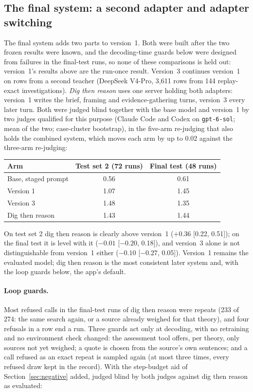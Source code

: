\subsection{The final system: a second adapter and adapter switching}\label{sec:final-system-results}
The final system adds two parts to version~1. Both were built after the two frozen results were known, and the
decoding-time guards below were designed from failures in the final-test runs, so none of these comparisons is held
out: version~1's results above are the run-once result. Version~3 continues version~1 on rows
from a second teacher (DeepSeek V4-Pro, 3,611 rows from 144 replay-exact investigations). \emph{Dig then reason} uses
one server holding both adapters: version~1 writes the brief, framing and evidence-gathering turns, version~3 every
later turn. Both were judged blind together with the base model and version~1 by two judges qualified for this purpose
(Claude Code and Codex on \texttt{gpt-6-sol}; mean of the two; case-cluster bootstrap), in the five-arm re-judging that
also holds the combined system, which moves each arm by up to 0.02 against the three-arm re-judging:

\begin{center}
\begin{tabular}{lcc}
\toprule
Arm & Test set 2 (72 runs) & Final test (48 runs)\\
\midrule
Base, staged prompt & 0.56 & 0.61\\
Version 1 & 1.07 & 1.45\\
Version 3 & 1.48 & 1.35\\
Dig then reason & 1.43 & 1.44\\
\bottomrule
\end{tabular}
\end{center}

On test set 2 dig then reason is clearly above version~1 ($+0.36$ [0.22, 0.51]); on the final test it is level with it
($-0.01$ [$-0.20$, 0.18]), and version~3 alone is not distinguishable from version~1 either ($-0.10$ [$-0.27$, 0.05]).
Version~1 remains the evaluated model; dig then reason is the most consistent later system and, with the loop guards
below, the app's default.

\paragraph{Loop guards.} Most refused calls in the final-test runs of dig then reason were repeats (233 of 274: the
same search again, or a source already weighed for that theory), and four refusals in a row end a run. Three guards act
only at decoding, with no retraining and no environment check changed: the assessment tool offers, per theory, only
sources not yet weighed; a quote is chosen from the source's own sentences; and a call refused as an exact repeat is
sampled again (at most three times, every refused draw kept in the record). With the step-budget aid of
Section~\ref{sec:negative} added, judged blind by both judges against dig then reason as evaluated:

